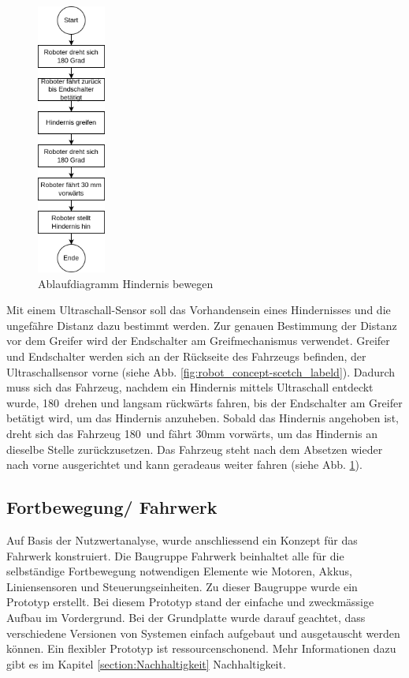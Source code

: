 \begin{figure}[H]
\centering
\includegraphics[width=0.2\textwidth]{assets/gesamtkonzept/ablaufdiagramm-hindernis-bewegen.png}
\caption{Ablaufdiagramm Hindernis bewegen}
\label{fig:ablaufdiagramm-hindernis-bewegen}
\end{figure}

 Mit einem Ultraschall-Sensor soll das Vorhandensein eines Hindernisses und die ungefähre Distanz dazu bestimmt werden. Zur genauen Bestimmung der Distanz vor dem Greifer wird der Endschalter am Greifmechanismus verwendet.
Greifer und Endschalter werden sich an der Rückseite des Fahrzeugs befinden, der Ultraschallsensor vorne (siehe Abb. \ref{fig:robot_concept-scetch_labeld}). Dadurch muss sich das Fahrzeug, nachdem ein Hindernis mittels Ultraschall entdeckt wurde, 180\textdegree\ drehen und langsam rückwärts fahren, bis der Endschalter am Greifer betätigt wird, um das Hindernis anzuheben. Sobald das Hindernis angehoben ist, dreht sich das Fahrzeug 180\textdegree\ und fährt 30mm vorwärts, um das Hindernis an dieselbe Stelle zurückzusetzen. Das Fahrzeug steht nach dem Absetzen wieder nach vorne ausgerichtet und kann geradeaus weiter fahren (siehe  Abb. \ref{fig:ablaufdiagramm-hindernis-bewegen}).


\subsection{Fortbewegung/ Fahrwerk}

Auf Basis der Nutzwertanalyse, wurde anschliessend ein Konzept für das Fahrwerk konstruiert. Die Baugruppe Fahrwerk beinhaltet alle für die selbständige Fortbewegung notwendigen Elemente wie Motoren, Akkus, Liniensensoren und Steuerungseinheiten. Zu dieser Baugruppe wurde ein Prototyp erstellt. Bei diesem Prototyp stand der einfache und zweckmässige Aufbau im Vordergrund. Bei der Grundplatte wurde darauf geachtet, dass verschiedene  Versionen von Systemen einfach aufgebaut und ausgetauscht werden können. Ein flexibler Prototyp ist ressourcenschonend. Mehr Informationen dazu gibt es im Kapitel \ref{section:Nachhaltigkeit} Nachhaltigkeit. 

